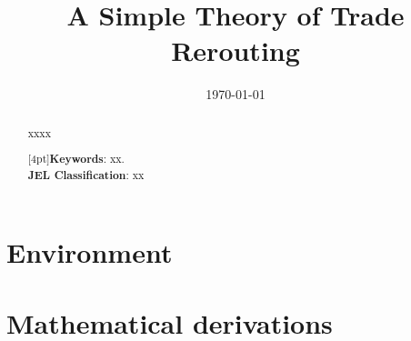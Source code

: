 \documentclass[11pt,letterpaper]{article}
\begin{document}
\title{\textbf{A Simple Theory of Trade Rerouting}}
\author{\large%
\setcounter{footnote}{0}%
}
\date{\today}
\maketitle

\vspace{-0.7cm}
\noindent\begin{abstract}\begin{singlespace}
\noindent xxxx
 
[4pt]\textbf{Keywords}: xx.
\\[4pt] \textbf{JEL Classification}: xx
\end{singlespace}
\end{abstract}

\newpage

\section{Environment}\label{sec:environment}




\appendix

\section{Mathematical derivations}\label{sec:math}

\end{document}
